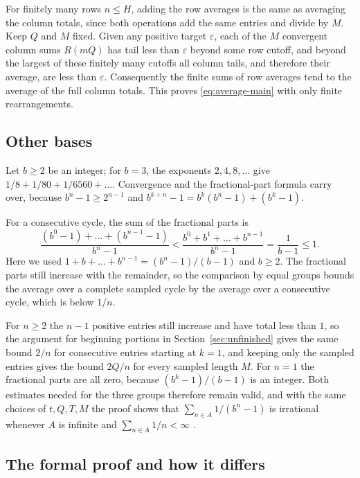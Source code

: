 \documentclass[10pt]{article}
\theoremstyle{plain}
\theoremstyle{definition}
\theoremstyle{remark}
\begin{document}
For finitely many rows $n\le H$, adding the row averages is the same
as averaging the column totals, since both operations add the same
entries and divide by $M$. Keep $Q$ and $M$ fixed. Given any positive
target $\varepsilon$, each of the $M$ convergent column sums $R(mQ)$
has tail less than $\varepsilon$ beyond some row cutoff, and beyond the
largest of these finitely many cutoffs all column tails, and therefore
their average, are less than $\varepsilon$. Consequently the finite
sums of row averages tend to the average of the full column totals.
This proves \eqref{eq:average-main} with only finite rearrangements.

\subsection{Other bases}\label{app:bases}

Let $b\ge2$ be an integer; for $b=3$, the exponents $2,4,8,\dots$ give
$1/8+1/80+1/6560+\dots$. Convergence and the fractional-part formula
carry over, because $b^n-1\ge2^{n-1}$ and
$b^{k+n}-1=b^k(b^n-1)+(b^k-1)$.

For a consecutive cycle, the sum of the fractional parts is
\[
 \frac{(b^0-1)+\dots+(b^{n-1}-1)}{b^n-1}
 <\frac{b^0+b^1+\dots+b^{n-1}}{b^n-1}
 =\frac1{b-1}\le1.
\]
Here we used $1+b+\dots+b^{n-1}=(b^n-1)/(b-1)$ and $b\ge2$. The
fractional parts still increase with the remainder, so the comparison by
equal groups bounds the average over a complete sampled cycle by the
average over a consecutive cycle, which is below $1/n$.

For $n\ge2$ the $n-1$ positive entries still increase and have total
less than $1$, so the argument for beginning portions in
Section~\ref{sec:unfinished} gives the same bound $2/n$ for consecutive
entries starting at $k=1$, and keeping only the sampled entries gives
the bound $2Q/n$ for every sampled length $M$. For $n=1$ the fractional
parts are all zero, because $(b^k-1)/(b-1)$ is an integer. Both
estimates needed for the three groups therefore remain valid, and with
the same choices of $t,Q,T,M$ the proof shows that
$\sum_{n\in A}1/(b^n-1)$ is irrational whenever $A$ is infinite and
$\sum_{n\in A}1/n<\infty$ \cite[Theorem~A.1]{shortpaper}.

\subsection{The formal proof and how it differs}\label{app:lean}
\end{document}
